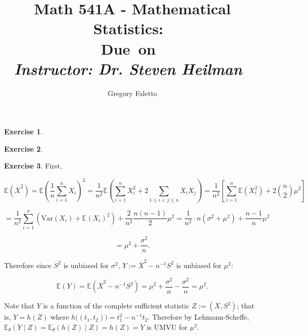 \documentclass{article}
\title{
    \vspace{2in}
    \textmd{\textbf{Math 541A - Mathematical Statistics:\ \hmwkTitle}}\\
    \normalsize\vspace{0.1in}\small{Due\ on\ \hmwkDueDate}\\
    \vspace{0.1in}\large{\textit{Instructor: Dr. Steven Heilman\ }}
    \vspace{3in}
}
\author{Gregory Faletto}
\date{}
\theoremstyle{definition}
\newtheorem{exercise}{Exercise}
\theoremstyle{definition}
\theoremstyle{definition}
\theoremstyle{definition}
\newcommand{\E}{\mathbb{E}}
\newcommand{\Var}{\mathrm{Var}}
\begin{document}
\maketitle

\pagebreak


\begin{exercise}

\end{exercise}

\begin{exercise}

\end{exercise}


\begin{exercise}

First,

\[
\E( \overline{X}^2) = \E \left( \frac{1}{n} \sum_{i=1}^n X_i \right)^2 =  \frac{1}{n^2}\E \left(  \sum_{i=1}^n X_i^2 + 2 \sum_{1 \leq i < j \leq n} X_i X_j \right) =  \frac{1}{n^2}\left[\sum_{i=1}^n \E \left(  X_i^2 \right) + 2 \binom{n}{2} \mu^2 \right]
\]

\[
=  \frac{1}{n^2}\sum_{i=1}^n \left( \Var(X_i) + \E(X_i)^2 \right) +  \frac{2}{n^2} \frac{n(n-1)}{2}  \mu^2 =  \frac{1}{n^2}\cdot n  \left( \sigma^2 + \mu^2 \right) +  \frac{n-1}{n} \mu^2
\]

\[
=  \mu^2 + \frac{\sigma^2}{n}.
\]

Therefore since \(S^2\) is unbiased for \(\sigma^2\), \(Y := \overline{X}^2 - n^{-1} S^2\) is unbiased for \(\mu^2\):

\[
\E(Y) = \E \left(  \overline{X}^2 - n^{-1} S^2 \right) =  \mu^2 + \frac{\sigma^2}{n} - \frac{\sigma^2}{n} = \mu^2.
\]

Note that \(Y\) is a function of the complete sufficient statistic \(Z:= (\overline{X}, S^2)\); that is, \(Y = h(Z)\) where \(h\big( (t_1, t_2) \big) = t_1^2 - n^{-1} t_2\). Therefore by Lehmann-Scheffe, \(\E_\theta (Y \mid Z) = \E_\theta(h(Z) \mid Z) = h(Z) = Y\) is UMVU for \(\mu^2\).

\end{exercise}
\end{document}
